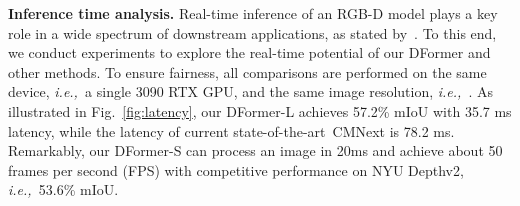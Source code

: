 \documentclass{article}
\newcommand{\figref}[1]{Fig.~\ref{#1}}
\newcommand{\myPara}[1]{\vspace{5pt}\noindent\textbf{#1}}
\newcommand{\sArt}{state-of-the-art~}
\def\ie{\emph{i.e.,~}}
\newcommand{\nMethod}{DFormer}
\begin{document}
\myPara{Inference time analysis.}
Real-time inference of an RGB-D model plays a key role in a wide spectrum of downstream applications, as stated by~\citep{chen2020sa_gate}.
To this end, we conduct experiments to explore the real-time potential of our \nMethod{} and other methods.
To ensure fairness, all comparisons are performed on the same device, \ie a single 3090 RTX GPU, and the same image resolution, \ie .
As illustrated in \figref{fig:latency}, our \nMethod{}-L achieves 57.2\% mIoU with 35.7 ms latency, while the latency of current \sArt CMNext is 78.2 ms. 
Remarkably, our \nMethod{}-S can process an image in 20ms and achieve about 50 frames per second (FPS) with competitive performance on NYU Depthv2, \ie 53.6\% mIoU.
\end{document}
